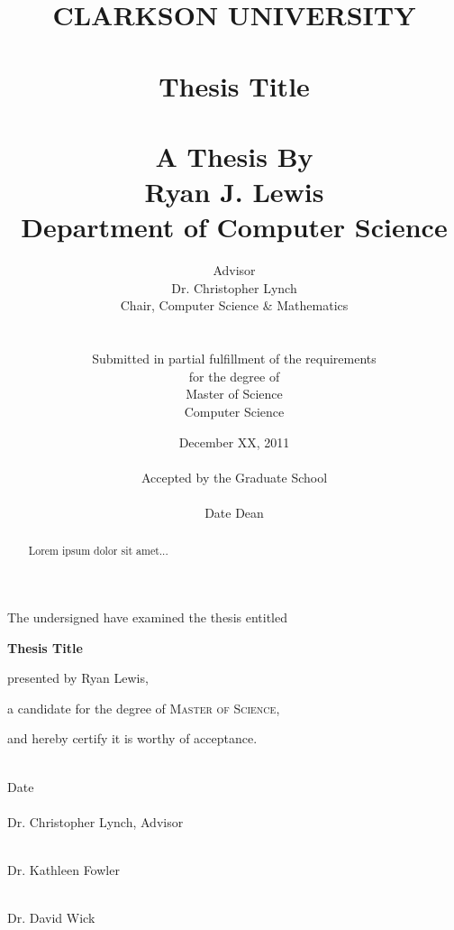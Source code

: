 \documentclass[letterpaper,12pt]{report}
\title{CLARKSON UNIVERSITY \\
\ \\
Thesis Title \\ 
\ \\
\large{A Thesis By \\
\textbf{Ryan J. Lewis} \\
Department of Computer Science \\
}}
\author{Advisor \\
Dr. 	Christopher Lynch \\
Chair, Computer Science \& Mathematics \\
\ \\ \\
Submitted in partial fulfillment of the requirements \\
for the degree of \\
Master of Science \\
Computer Science}
\date{December XX, 2011 \\
\ \\
Accepted by the Graduate School \\
\vspace{.5in}
\hrulefill \\
Date \hspace{2in} Dean
}
\begin{document}
\maketitle

\newpage
\thispagestyle{empty}
\begin{center}
The undersigned have examined the thesis entitled

\vspace{0.4in}

\textbf{Thesis Title}

\vspace{0.4in}

presented by Ryan Lewis,

\vspace{0.4in}

a candidate for the degree of \textsc{Master of Science},

\vspace{0.4in}

and hereby certify it is worthy of acceptance.

\vspace{0.5in}
\hrulefill \\

Date \\
\vspace{0.5in}
\hrulefill \\
\hfill Dr. Christopher Lynch, Advisor

\vspace{0.5in}
\hrulefill \\
\hfill Dr. Kathleen Fowler

\vspace{0.5in}
\hrulefill \\
\hfill Dr. David Wick
\end{center}

\begin{abstract}
Lorem ipsum dolor sit amet...
\end{abstract}

\cleardoublepage


\tableofcontents

\cleardoublepage



%


%
%


\begin{appendices}

\end{appendices}
\end{document}
